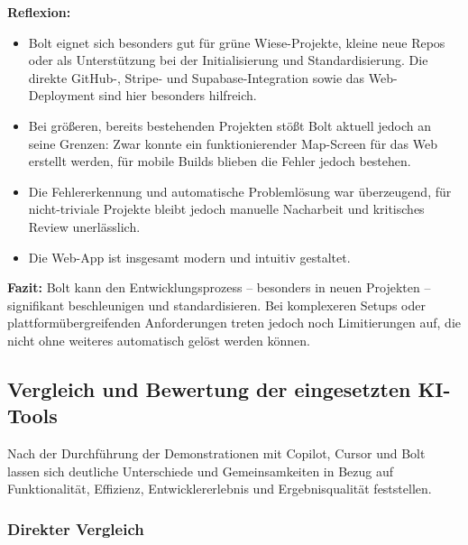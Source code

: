 \textbf{Reflexion:}
\begin{itemize}
      \item Bolt eignet sich besonders gut für grüne Wiese-Projekte, kleine neue Repos oder
            als Unterstützung bei der Initialisierung und Standardisierung. Die direkte
            GitHub-, Stripe- und Supabase-Integration sowie das Web-Deployment sind hier
            besonders hilfreich.
      \item Bei größeren, bereits bestehenden Projekten stößt Bolt aktuell jedoch an seine
            Grenzen: Zwar konnte ein funktionierender Map-Screen für das Web erstellt
            werden, für mobile Builds blieben die Fehler jedoch bestehen.
      \item Die Fehlererkennung und automatische Problemlösung war überzeugend, für
            nicht-triviale Projekte bleibt jedoch manuelle Nacharbeit und kritisches Review
            unerlässlich.
      \item Die Web-App ist insgesamt modern und intuitiv gestaltet.
\end{itemize}

\textbf{Fazit:}
Bolt kann den Entwicklungsprozess – besonders in neuen Projekten – signifikant beschleunigen und standardisieren. Bei komplexeren Setups oder plattformübergreifenden Anforderungen treten jedoch noch Limitierungen auf, die nicht ohne weiteres automatisch gelöst werden können.

\subsection{Vergleich und Bewertung der eingesetzten KI-Tools}

Nach der Durchführung der Demonstrationen mit Copilot, Cursor und Bolt lassen
sich deutliche Unterschiede und Gemeinsamkeiten in Bezug auf Funktionalität,
Effizienz, Entwicklererlebnis und Ergebnisqualität feststellen.

\subsubsection{Direkter Vergleich}

